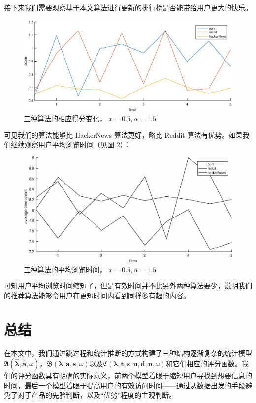 \documentclass[UTF8]{ctexart}
\theoremstyle{plain}
\theoremstyle{definition}
\theoremstyle{remark}
\begin{document}
	接下来我们需要观察基于本文算法进行更新的排行榜是否能带给用户更大的快乐。
	\begin{figure}[h!]
		\centering
		\includegraphics[width = \linewidth]{../model/douhu/pic/three-method-score.eps}
		\caption{三种算法的相应得分变化， $x=0.5, \alpha=1.5$}\label{fig:three-method-score}
	\end{figure}
	可见我们的算法能够比 HackerNews 算法更好，略比 Reddit 算法有优势。如果我们继续观察用户平均浏览时间（见图 \ref{fig:three-method-average-time}）：
	\begin{figure}[h!]
		\centering
		\includegraphics[width = \linewidth]{../model/douhu/pic/three-method-average-time.eps}
		\caption{三种算法的平均浏览时间， $x=0.5, \alpha=1.5$}\label{fig:three-method-average-time}
	\end{figure}
	可知用户平均浏览时间缩短了，但是有效时间并不比另外两种算法要少，说明我们的推荐算法能够令用户在更短时间内看到同样多有趣的内容。

	\section{总结}
	在本文中，我们通过跳过程和统计推断的方式构建了三种结构逐渐复杂的统计模型$\mathfrak{A}\left(\bm{\hat{\lambda}}, \bm{\hat{a}}, \omega\right)$，$\mathfrak{B}\left(\bm{\lambda}, \bm{a}, \bm{s}, \omega\right)$以及$\mathfrak{C}\left(\bm{\lambda}, \bm{t}, \bm{s}, \bm{u}, \bm{d}, \bm{n},\omega\right)$和它们相应的评分函数。我们的评分函数具有明确的实际意义，前两个模型着眼于缩短用户寻找到想要信息的时间，最后一个模型着眼于提高用户的有效访问时间——通过从数据出发的手段避免了对于产品的先验判断，以及“优劣”程度的主观判断。 \\
	
\end{document}
